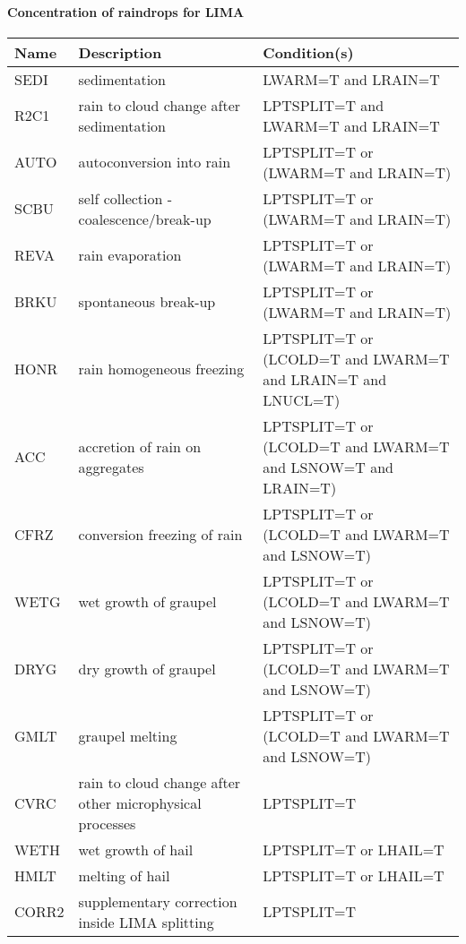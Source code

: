 \paragraph{Concentration of raindrops for LIMA}
\mbox{} %

\begin{longtable} {|p{}|p{}|p{}|}
\hline
Name & Description & Condition(s) \\
\hline \hline
SEDI   & sedimentation                                            & LWARM=T and LRAIN=T \\\hline
R2C1   & rain to cloud change after sedimentation                 & LPTSPLIT=T and LWARM=T and LRAIN=T \\\hline
AUTO   & autoconversion into rain                                 & LPTSPLIT=T or (LWARM=T and LRAIN=T) \\\hline
SCBU   & self collection - coalescence/break-up                   & LPTSPLIT=T or (LWARM=T and LRAIN=T) \\\hline
REVA   & rain evaporation                                         & LPTSPLIT=T or (LWARM=T and LRAIN=T) \\\hline
BRKU   & spontaneous break-up                                     & LPTSPLIT=T or (LWARM=T and LRAIN=T)        \\\hline
HONR   & rain homogeneous freezing                                & LPTSPLIT=T or (LCOLD=T and LWARM=T and LRAIN=T and LNUCL=T) \\\hline
ACC    & accretion of rain on aggregates                          & LPTSPLIT=T or (LCOLD=T and LWARM=T and LSNOW=T and LRAIN=T) \\\hline
CFRZ   & conversion freezing of rain                              & LPTSPLIT=T or (LCOLD=T and LWARM=T and LSNOW=T) \\\hline
WETG   & wet growth of graupel                                    & LPTSPLIT=T or (LCOLD=T and LWARM=T and LSNOW=T) \\\hline
DRYG   & dry growth of graupel                                    & LPTSPLIT=T or (LCOLD=T and LWARM=T and LSNOW=T) \\\hline
GMLT   & graupel melting                                          & LPTSPLIT=T or (LCOLD=T and LWARM=T and LSNOW=T) \\\hline
CVRC   & rain to cloud change after other microphysical processes & LPTSPLIT=T \\\hline
WETH   & wet growth of hail                                       & LPTSPLIT=T or LHAIL=T \\\hline
HMLT   & melting of hail                                          & LPTSPLIT=T or LHAIL=T \\\hline
CORR2  & supplementary correction inside LIMA splitting           & LPTSPLIT=T \\\hline
\endhead
\end{longtable}

